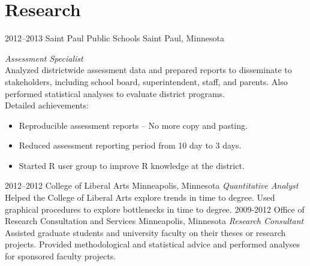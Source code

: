 \documentclass[]{friggeri-cv} %
\begin{document}

\section{Research}



\begin{entrylist}
\entry
{2012--2013}
{Saint Paul Public Schools}
{Saint Paul, Minnesota}
{\emph{Assessment Specialist} \\
Analyzed districtwide assessment data and prepared reports to disseminate to stakeholders, including school board, superintendent, staff, and parents. Also performed statistical analyses to evaluate district programs. \\
Detailed achievements:
\begin{itemize}
\item Reproducible assessment reports -- No more copy and pasting.
\item Reduced assessment reporting period from 10 day to 3 days.
\item Started R user group to improve R knowledge at the district.
\end{itemize}}
\entry
{2012--2012}
{College of Liberal Arts}
{Minneapolis, Minnesota}
{\emph{Quantitative Analyst} \\
Helped the College of Liberal Arts explore trends in time to degree. Used graphical procedures to explore bottlenecks in time to degree.}
\entry
{2009-2012}
{Office of Research Consultation and Services}
{Minneapolis, Minnesota}
{\emph{Research Consultant} \\
Assisted graduate students and university faculty on their theses or research projects. Provided methodological and statistical advice and performed analyses for sponsored faculty projects.}

\end{entrylist}
\end{document}
